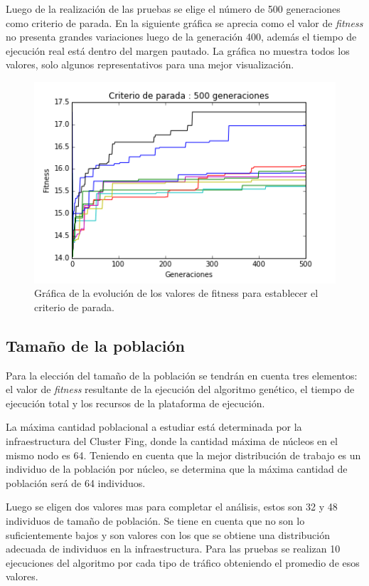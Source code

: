 Luego de la realización de las pruebas se elige el número de 500 generaciones como criterio de parada.
En la siguiente gráfica se aprecia como el valor de \emph{fitness} no presenta grandes variaciones luego de la generación 400, además el tiempo de ejecución real está dentro del margen pautado. La gráfica no muestra todos los valores, solo algunos representativos para una mejor visualización.



\begin{figure}[h]
\centering
\includegraphics[width=0.8\linewidth]{Figures/criterio_parada}
\caption[Gráfica de la evolución de los valores de fitness. ]{Gráfica de la evolución de los valores de fitness para establecer el criterio de parada.}
\label{fig:criterio_parada}
\end{figure}



\subsection{Tamaño de la población}

Para la elección del tamaño de la población se tendrán en cuenta tres elementos: el valor de \emph{fitness} resultante de la ejecución del algoritmo genético, el tiempo de ejecución total y los recursos de la plataforma de ejecución.

La máxima cantidad poblacional a estudiar está determinada por la infraestructura del Cluster Fing, donde la cantidad máxima de núcleos en el mismo nodo es 64. Teniendo en cuenta que la mejor distribución de trabajo es un individuo de la población por núcleo, se determina que la máxima cantidad de población será de 64 individuos.

Luego se eligen dos valores mas para completar el análisis, estos son 32 y 48 individuos de tamaño de población. Se tiene en cuenta que no son lo suficientemente bajos y son valores con los que se obtiene una distribución adecuada de individuos en la infraestructura. Para las pruebas se realizan 10 ejecuciones del algoritmo por cada tipo de tráfico obteniendo el promedio de esos valores.

